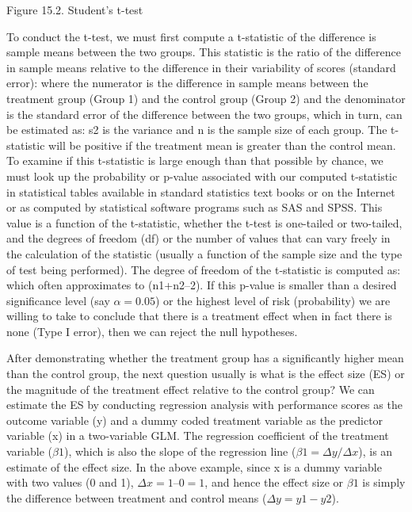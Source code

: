 Figure 15.2. Student’s t-test

To conduct the t-test, we must first compute a t-statistic of the difference is sample means between the two groups. This statistic is the ratio of the difference in sample means relative to the difference in their variability of scores (standard error): where the numerator is the difference in sample means between the treatment group (Group 1) and the control group (Group 2) and the denominator is the standard error of the difference between the two groups, which in turn, can be estimated as: s2 is the variance and n is the sample size of each group. The t-statistic will be positive if the treatment mean is greater than the control mean. To examine if this t-statistic is large enough than that possible by chance, we must look up the probability or p-value associated with our computed t-statistic in statistical tables available in standard statistics text books or on the Internet or as computed by statistical software programs such as SAS and SPSS. This value is a function of the t-statistic, whether the t-test is one-tailed or two-tailed, and the degrees of freedom (df) or the number of values that can vary freely in the calculation of the statistic (usually a function of the sample size and the type of test being performed). The degree of freedom of the t-statistic is computed as: which often approximates to (n1+n2–2). If this p-value is smaller than a desired significance level (say $ \alpha = 0.05 $) or the highest level of risk (probability) we are willing to take to conclude that there is a treatment effect when in fact there is none (Type I error), then we can reject the null hypotheses.

After demonstrating whether the treatment group has a significantly higher mean than the control group, the next question usually is what is the effect size (ES) or the magnitude of the treatment effect relative to the control group? We can estimate the ES by conducting regression analysis with performance scores as the outcome variable (y) and a dummy coded treatment variable as the predictor variable (x) in a two-variable GLM. The regression coefficient of the treatment variable ($ \beta1 $), which is also the slope of the regression line ($ \beta1 = \Delta y/\Delta x $), is an estimate of the effect size. In the above example, since x is a dummy variable with two values (0 and 1), $ \Delta x = 1–0 = 1 $, and hence the effect size or $ \beta1 $ is simply the difference between treatment and control means ($ \Delta y = y1- y2 $).

